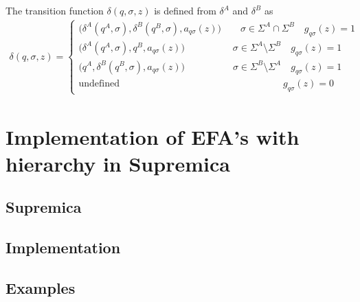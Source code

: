 \documentclass{article}
\begin{document}
 The transition function
$\delta(q,\sigma,z)$ is defined from $\delta^A$ and $\delta^B$ as
\begin{eqnarray}
\delta(q,\sigma,z)=\left\{
\begin{array}{ll}
\big(\delta^A(q^A,\sigma),\delta^B(q^B,\sigma),a_{q \sigma}(z)\big) \quad\quad \sigma\in \Sigma^A \cap \Sigma^B \quad g_{q \sigma}(z)=1\\
\big(\delta^A(q^A,\sigma),q^B,a_{q \sigma}(z)\big) \quad\quad\quad\quad\quad \sigma\in \Sigma^A \setminus \Sigma^B \quad g_{q \sigma}(z)=1\\
\big(q^A,\delta^B(q^B,\sigma),a_{q \sigma}(z)\big) \quad\quad\quad\quad\quad \sigma\in \Sigma^B \setminus \Sigma^A \quad g_{q \sigma}(z)=1\\
\textrm{
undefined}\quad\quad\quad\quad\quad\quad\quad\quad\quad\quad\quad\quad\quad\quad\quad\quad\quad
g_{q\sigma}(z)=0
\end{array}\right.
\end{eqnarray}

\section{Implementation of EFA's with hierarchy in Supremica}

\subsection{Supremica}

\subsection{Implementation}\label{Implementation}
\subsection{Examples}
\end{document}
